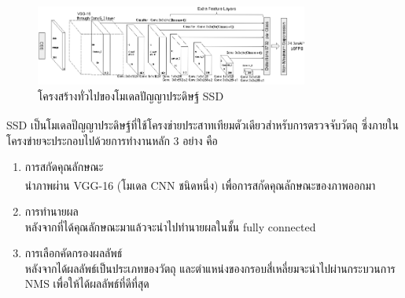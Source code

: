 \begin{figure}[!ht]
	\centering
	\includegraphics[width=0.8\textwidth]{chapter2/images/vgg.jpg}
		\caption{โครงสร้างทั่วไปของโมเดลปัญญาประดิษฐ์ SSD}
    	\label{fig:ssd}
\end{figure}

SSD\textsuperscript{\cite{faster}} เป็นโมเดลปัญญาประดิษฐ์ที่ใช้โครงข่ายประสาทเทียมตัวเดียวสำหรับการตรวจจับวัตถุ ซึ่งภายในโครงข่ายจะประกอบไปด้วยการทำงานหลัก 3 อย่าง คือ
\begin{enumerate}
	\setlength\itemsep{-0.25em}
	\item การสกัดคุณลักษณะ\\
	นำภาพผ่าน VGG-16\textsuperscript{\cite{vgg}} (โมเดล CNN ชนิดหนึ่ง) เพื่อการสกัดคุณลักษณะของภาพออกมา
	\item การทำนายผล\\
	หลังจากที่ได้คุณลักษณะมาแล้วจะนำไปทำนายผลในชั้น fully connected
	\item การเลือกคัดกรองผลลัพธ์\\
	หลังจากได้ผลลัพธ์เป็นประเภทของวัตถุ และตำแหน่งของกรอบสี่เหลี่ยมจะนำไปผ่านกระบวนการ NMS เพื่อให้ได้ผลลัพธ์ที่ดีที่สุด  
\end{enumerate}

